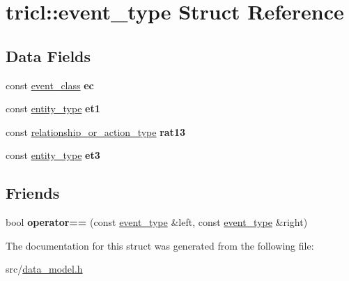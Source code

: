 \hypertarget{structtricl_1_1event__type}{}\section{tricl\+:\+:event\+\_\+type Struct Reference}
\label{structtricl_1_1event__type}
\subsection*{Data Fields}
\begin{DoxyCompactItemize}
\item 
\mbox{\label{structtricl_1_1event__type_a19e2bce4d3ba86cd149ac443e6189a21}} 
const \hyperlink{data__model_8h_a6967089e2c0837f273d8cb5fd9f7e46d}{event\+\_\+class} {\bfseries ec}
\item 
\mbox{\label{structtricl_1_1event__type_ae1b97b7244cfc3edb110fc597695c184}} 
const \hyperlink{data__model_8h_afd4de3aedd5e48cf955f03457386e98f}{entity\+\_\+type} {\bfseries et1}
\item 
\mbox{\label{structtricl_1_1event__type_a12e8607ea565fb26c5392417bf4a34e9}} 
const \hyperlink{data__model_8h_a2d01894944fb58a8fedc0912a48d13f8}{relationship\+\_\+or\+\_\+action\+\_\+type} {\bfseries rat13}
\item 
\mbox{\label{structtricl_1_1event__type_a6357a3b67f24559c66158260099f8847}} 
const \hyperlink{data__model_8h_afd4de3aedd5e48cf955f03457386e98f}{entity\+\_\+type} {\bfseries et3}
\end{DoxyCompactItemize}
\subsection*{Friends}
\begin{DoxyCompactItemize}
\item 
\mbox{\label{structtricl_1_1event__type_ac6ea5340a97cf343356e390f082881de}} 
bool {\bfseries operator==} (const \hyperlink{structtricl_1_1event__type}{event\+\_\+type} \&left, const \hyperlink{structtricl_1_1event__type}{event\+\_\+type} \&right)
\end{DoxyCompactItemize}


The documentation for this struct was generated from the following file\+:\begin{DoxyCompactItemize}
\item 
src/\hyperlink{data__model_8h}{data\+\_\+model.\+h}\end{DoxyCompactItemize}
